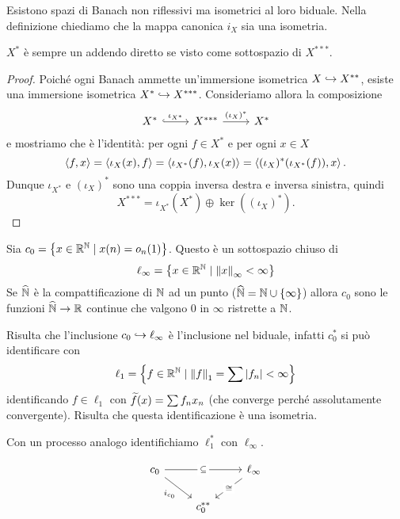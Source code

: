 \begin{remark}
Esistono spazi di Banach non riflessivi ma isometrici al loro biduale. Nella definizione chiediamo che la mappa canonica $i_X$ sia una isometria.
\end{remark}

\begin{lemma}\label{LmDualeComplementatoNelTriduale}
$X^\ast$ \`e sempre un addendo diretto se visto come sottospazio di $X^{\ast\ast\ast}$.
\end{lemma}
\begin{proof}
Poich\'e ogni Banach ammette un'immersione isometrica $X\hookrightarrow X^{\ast\ast}$, esiste una immersione isometrica $X^\ast\hookrightarrow X^{\ast\ast\ast}$. Consideriamo allora la composizione
\[\begin{tikzcd}
	{X^\ast} & {X^{\ast\ast\ast}} & {X^\ast}
	\arrow["{\iota_{X^\ast}}", hook, from=1-1, to=1-2]
	\arrow["{(\iota_X)^\ast}", from=1-2, to=1-3]
\end{tikzcd}\]
e mostriamo che \`e l'identit\`a: per ogni $f\in X^\ast$ e per ogni $x\in X$
\[\left\langle {f,x}\right\rangle=\left\langle {\iota_{X}(x),f}\right\rangle=\left\langle {\iota_{X^\ast}(f),\iota_{X}(x)}\right\rangle=\left\langle {(\iota_X)^\ast(\iota_{X^\ast}(f)),x}\right\rangle.\]
Dunque $\iota_{X^\ast}$ e $(\iota_X)^\ast$ sono una coppia inversa destra e inversa sinistra, quindi
\[X^{\ast\ast\ast}=\iota_{X^\ast}(X^\ast)\oplus \ker((\iota_X)^\ast).\]
\end{proof}


\begin{example}\label{ExDualel1c0}
Sia $c_0=\left\{{x\in \mathbb{R}^{\mathbb{N}}\mid x(n)=o_n(1)}\right\}$. Questo \`e un sottospazio chiuso di \[\ell_\infty=\left\{{x\in \mathbb{R}^{\mathbb{N}}\mid \left\Vert{x}\right\Vert_\infty< \infty}\right\}\]
Se $\widehat{\mathbb{N}}$ \`e la compattificazione di $\mathbb{N}$ ad un punto ($\widehat{\mathbb{N}}=\mathbb{N}\cup\left\{{\infty}\right\}$) allora $c_0$ sono le funzioni $\widehat{\mathbb{N}}\to \mathbb{R}$ continue che valgono $0$ in $\infty$ ristrette a $\mathbb{N}$.


Risulta che l'inclusione $c_0\hookrightarrow \ell_\infty$ \`e l'inclusione nel biduale, infatti $c_0^\ast$ si pu\`o identificare con
\[\ell_1=\left\{{f\in\mathbb{R}^{\mathbb{N}}\mid \left\Vert{f}\right\Vert_1=\sum\left|{f_n}\right|<\infty}\right\}\]
identificando $f\in \ell_1$ con $\widetilde{f}(x)=\sum f_n x_n$ (che converge perch\'e assolutamente convergente). Risulta che questa identificazione \`e una isometria. 

Con un processo analogo identifichiamo $\ell_1^\ast$ con $\ell_\infty$.

\[\begin{tikzcd}
	{c_0} && {\ell_\infty} \\
	& {c_0^{\ast\ast}}
	\arrow["\subseteq"{description}, from=1-1, to=1-3]
	\arrow["{i_{c_0}}"', from=1-1, to=2-2]
	\arrow["\cong"{description}, from=1-3, to=2-2]
\end{tikzcd}\]
\end{example}

